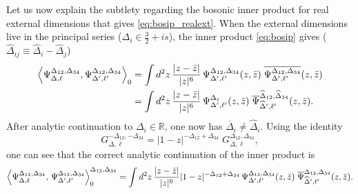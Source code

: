 \documentclass[11pt]{article}
\newcommand{\zb}{\bar{z}}
\begin{document}
Let us now explain the subtlety regarding the bosonic inner product for real external dimensions that gives \eqref{eq:bosip_realext}. When the external dimensions live in the principal series ($\Delta_{i} \in \frac{3}{2}+is$), the inner product \eqref{eq:bosip} gives ($\widehat{\Delta}_{ij} \equiv \widehat{\Delta}_{i} - \widehat{\Delta}_{j}$)
%
\begin{equation}\label{eq:bosip_cpw}
\begin{split}
\expval{ \Psi_{\Delta,\ell}^{\Delta_{12},\Delta_{34}},\Psi_{\Delta',\ell'}^{\Delta_{12},\Delta_{34}} }_{0} 
	&= \int d^{2}z\,\frac{|z-\zb|}{|z|^{6}}\,
		\Psi_{\Delta',\ell'}^{\Delta_{12},\Delta_{34}}(z,\zb) \; 
		\overline{\Psi_{\Delta',\ell'}^{\Delta_{12},\Delta_{34}}}(z,\zb) \\
	&= 
		\int d^{2}z\,\frac{|z-\zb|}{|z|^{6}}\,
			\Psi_{\Delta',\ell'}^{\Delta_{i}}(z,\zb) \; 
			\overline{\Psi}_{\widehat{\Delta}',\ell'}^{\widehat{\Delta}_{12},\widehat{\Delta}_{34}}(z,\zb).
\end{split}
\end{equation}
%
After analytic continuation to $\Delta_{i} \in \mathbb{R}$, one now has 
$\overline{\Delta}_i \neq \widehat{\Delta}_{i}$. Using the identity
%
\begin{equation}\label{eq:confblock_id}
G_{\Delta,\ell}^{-\Delta_{12},-\Delta_{34}} = 
 |1-z|^{-\Delta_{12}+\Delta_{34}} \; G_{\Delta,\ell}^{\Delta_{12},\Delta_{34}},
\end{equation}
one can see that the correct analytic continuation of the inner product is
%
\begin{equation}\label{eq:bosip_correct}
\expval{ \Psi_{\Delta,\ell}^{\Delta_{12},\Delta_{34}},\,
	\Psi_{\Delta',\ell'}^{\Delta_{12},\Delta_{34}} }_{0}^{\Delta_{12},\Delta_{34}} = 
\int d^{2}z\,\frac{|z-\zb|}{|z|^{6}}|1-z|^{-\Delta_{12}+\Delta_{34}}\,
	\Psi_{\Delta',\ell'}^{\Delta_{12},\Delta_{34}}(z,\zb)\;
	\overline{\Psi}_{\widehat{\Delta}',\ell'}^{\Delta_{12},\Delta_{34}}(z,\zb).
\end{equation}
%
\end{document}
